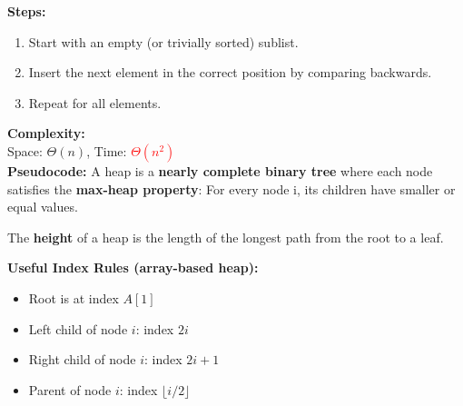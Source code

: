 \documentclass[a4paper,landscape]{article}
\newcommand{\timecomplexity}[1]{\textcolor{red}{#1}}
\begin{document}
\begin{multicols}{7}
\tcolorbox[mybox={Insertion Sort}]
\textbf{Steps:}
\begin{enumerate}[noitemsep, topsep=0pt]
    \item Start with an empty (or trivially sorted) sublist.
    \item Insert the next element in the correct position by comparing backwards.
    \item Repeat for all elements.
\end{enumerate}
\textbf{Complexity:}\\
Space: \( \Theta(n) \), Time: \timecomplexity{\( \Theta(n^2) \)}\\
\textbf{Pseudocode:}
\noindent %
\endtcolorbox
\tcolorbox[mybox={Heap Sort}]
A heap is a \textbf{nearly complete binary tree} where each node satisfies the \textbf{max-heap property}:
For every node i, its children have smaller or equal values.

The \textbf{height} of a heap is the length of the longest path from the root to a leaf.

\textbf{Useful Index Rules (array-based heap):}
\begin{itemize}[noitemsep, topsep=0pt]
    \item Root is at index \( A[1] \)
    \item Left child of node \( i \): index \( 2i \)
    \item Right child of node \( i \): index \( 2i + 1 \)
    \item Parent of node \( i \): index \( \lfloor i/2 \rfloor \)
\end{itemize}


\end{multicols}
\end{document}
